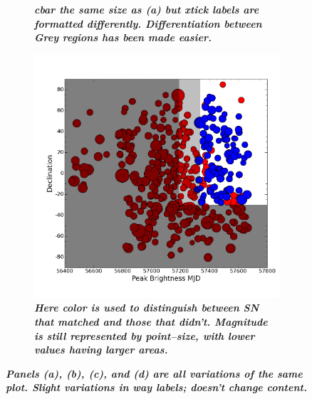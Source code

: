 \begin{figure}
\begin{subfigure}{.5\textwidth}
		\caption{\it \small{{\bf cbar the same size as (a) but xtick labels are formatted differently. Differentiation between Grey regions has been made easier.}}}
		\label{fig:var3}
	\end{subfigure}%
	\begin{subfigure}{.5\textwidth}
	  \centering
			\includegraphics[width=1\linewidth]{figures/variations/mag_ps_not_color.png}
		\caption{\it \small{{\bf Here color is used to distinguish between SN that matched and those that didn't. Magnitude is still represented by point--size, with lower values having larger areas.}}}
		\label{fig:var4}
	\end{subfigure}
	\caption{\it \small{{\bf Panels (a), (b), (c), and (d) are all variations of the same plot. Slight variations in way labels; doesn't change content.}}}
	\label{fig:variations}
\end{figure}




